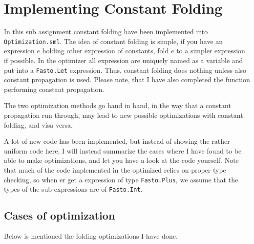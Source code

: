 \documentclass[11pt,a4paper]{article}
\begin{document}
\section{Implementing Constant Folding} 
In this sub assignment constant folding have been implemented into
\texttt{Optimization.sml}. The idea of constant folding is simple, if you have
an expression $e$ holding other expression of constants, fold $e$ to a simpler
expression if possible.
In the optimizer all expression are uniquely named as a variable and put into
a \texttt{Fasto.Let} expression. Thus, constant folding does nothing unless
also constant propagation is used. Please note, that I have also completed the
function performing constant propagation. 

The two optimization methods go hand in hand, in the way that a constant
propagation run through, may lead to new possible optimizations with constant
folding, and visa versa.

A lot of new code has been implemented, but instead of showing the rather
uniform code here, I will instead summarize the cases where I have found to be able
to make optimizations, and let you have a look at the code yourself. Note that
much of the code implemented in the optimized relies on proper type
checking, so when er get a expression of type \texttt{Fasto.Plus}, we assume
that the types of the sub-expressions are of \texttt{Fasto.Int}.


\subsection{Cases of optimization}
Below is mentioned the folding optimizations I have done.
\end{document}
